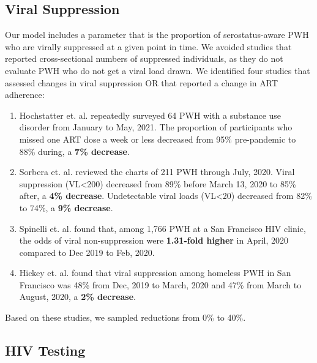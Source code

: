 \documentclass{article}
\begin{document}
\newpage
\subsection{Viral Suppression}

Our model includes a parameter that is the proportion of serostatus-aware PWH who are virally suppressed at a given point in time. We avoided studies that reported cross-sectional numbers of suppressed individuals, as they do not evaluate PWH who do not get a viral load drawn. We identified four studies that assessed changes in viral suppression OR that reported a change in ART adherence:

\begin{enumerate}
	\item Hochstatter et. al. \cite{hochstatter2021} repeatedly surveyed 64 PWH with a substance use disorder from January to May, 2021. The proportion of participants who missed one ART dose a week or less decreased from 95\% pre-pandemic to 88\% during, a \textbf{7\% decrease}.
	\item Sorbera et. al. \cite{sorbera2021} reviewed the charts of 211 PWH through July, 2020. Viral suppression (VL<200) decreased from 89\% before March 13, 2020 to 85\% after, a \textbf{4\% decrease}. Undetectable viral loads (VL<20) decreased from 82\% to 74\%, a \textbf{9\% decrease}.
	\item Spinelli et. al. \cite{spinelli2020} found that, among 1,766 PWH at a San Francisco HIV clinic, the odds of viral non-suppression were \textbf{1.31-fold higher} in April, 2020 compared to Dec 2019 to Feb, 2020.
	\item Hickey et. al. \cite{hickey2021} found that viral suppression among homeless PWH in San Francisco was 48\% from Dec, 2019 to March, 2020 and 47\% from March to August, 2020, a \textbf{2\% decrease}.
\end{enumerate}

Based on these studies, we sampled reductions from 0\% to 40\%.

\subsection{HIV Testing}
\end{document}
